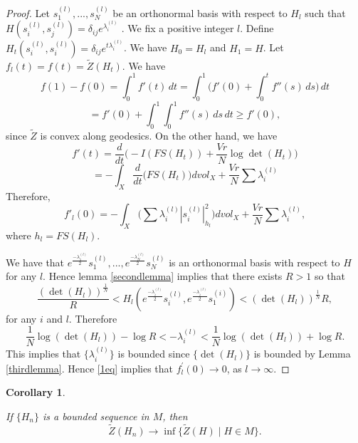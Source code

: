 \documentclass[12pt,oneside,notitlepage]{amsart}
\newtheorem{cor}[thm]{Corollary}
\theoremstyle{definition}
\theoremstyle{remark}
\numberwithin{equation}{section}
\begin{document}
\begin{proof}

Let  $s_{1}^{(l)},...,s_{N}^{(l)}$ be an orthonormal basis with
respect to $H_{l}$ such that
$H(s_{i}^{(l)},s_{j}^{(l)})=\delta_{ij} e^{\lambda^{(l)}_{i}}$ .
We fix a positive integer $l$.  Define
$H_{t}(s_{i}^{(l)},s_{i}^{(l)})=\delta_{ij}
e^{t\lambda^{(l)}_{i}}$. We have $H_{0}=H_{l}$ and $H_{1}=H$. Let
$f_{l}(t)=f(t)=\widetilde{Z}(H_{t})$. We have
$$f(1)-f(0)=\int_{0}^{1} f'(t)\, dt=\int_{0}^{1}
\Big(f'(0)+\int_{0}^{t} f''(s)\, ds \Big)\, dt$$
$$=f'(0)+\int_{0}^{1} \int_{0}^{1} f''(s) \,ds\,dt\geq
f'(0),$$since $\widetilde{Z}$ is convex along geodesics. On the
other hand, we have
$$f'(t)=\frac{d}{dt}\Big(-I(FS(H_{t}))+\frac{Vr}{N} \log
\det(H_{t})\Big)$$
$$=-\int_{X} \frac{d}{dt}\big(FS(H_{t})\big) dvol_{X}+\frac{Vr}{N}\sum
\lambda^{(l)}_{i}$$ Therefore,
\begin{equation}\label{1eq}f'_{l}(0)=-\int_{X} \big( \sum \lambda^{(l)}_{i}
|s_{i}^{(l)}|^{2}_{h_{l}} \big) dvol_{X}+\frac{Vr}{N}\sum
\lambda^{(l)}_{i},\end{equation} where $h_{l}=FS(H_{l}).$

We have that
$e^{\frac{-\lambda^{(l)}_{1}}{2}}s_{1}^{(l)},...,e^{\frac{-\lambda^{(l)}_{N}}{2}}s_{N}^{(l)}$
is an orthonormal basis with respect to $H$ for any $l$. Hence
lemma \ref{secondlemma} implies that there exists $R >1$ so that
$$\frac{(\det(H_{l}))^{\frac{1}{N}}}{R} <   H_{l}(e^{\frac{-\lambda^{(l)}_{i}}{2}}s_{i}^{(l)},e^{\frac{-\lambda^{(l)}_{i}}{2}}s_{1}^{(i)})            <
(\det(H_{l}))^{\frac{1}{N}}R,$$ for any $i$ and $l$. Therefore
$$ \frac{1}{N} \log (\det(H_{l}))- \log R <-\lambda^{(l)}_{i}<
\frac{1}{N} \log (\det(H_{l}))+ \log R.$$ This implies that
$\{\lambda^{(l)}_{i}\}$ is bounded since $\{\det(H_{l})\}$ is
bounded by Lemma \ref{thirdlemma}. Hence \eqref{1eq} implies that
$f^{'}_{l} (0)\longrightarrow 0$, as $l \longrightarrow \infty.$

\end{proof}

\begin{cor}\label{secondcor}

If $\{H_{n}\}$ is a bounded sequence in $M$, then
$$\widetilde{Z}(H_{n}) \longrightarrow \inf
\{\widetilde{Z}(H)\mid H \in M\}.$$\\

\end{cor}
\end{document}
